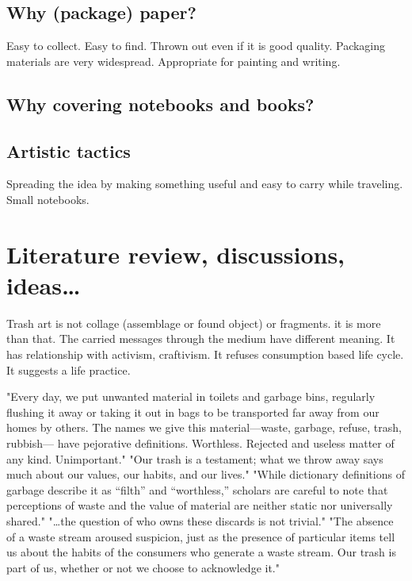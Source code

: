 \documentclass[12pt]{article}
\begin{document}
\subsection{Why (package) paper?}
Easy to collect. Easy to find. Thrown out even if it is good quality. Packaging materials are very widespread. Appropriate for painting and writing.

\subsection{Why covering notebooks and books?}

\subsection{Artistic tactics}
Spreading the idea by making something useful and easy to carry while traveling. Small notebooks.  

\section{Literature review, discussions, ideas\ldots}
Trash art is not collage (assemblage or found object) or fragments. it is more than that. The carried messages through the medium have different meaning. It has relationship with activism, craftivism. It refuses consumption based life cycle. It suggests a life practice.

"Every day, we put unwanted material in toilets and garbage bins, regularly flushing it away or taking it out in bags to be transported far away from our homes by others. The names we give this material---waste, garbage, refuse, trash, rubbish--- have pejorative definitions. Worthless. Rejected and useless matter of any kind. Unimportant." "Our trash is a testament; what we throw away says much about our values, our habits, and our lives." "While dictionary definitions of garbage describe it as “filth” and “worthless,” scholars are careful to note that perceptions of waste and the value of material are neither static nor universally shared." "\ldots the question of who owns these discards is not trivial." "The absence of a waste stream aroused suspicion, just as the presence of particular items tell us about the habits of the consumers who generate a waste stream. Our trash is part of us, whether or not we choose to acknowledge it." \cite{zimring2012encyclopedia}

\end{document}
